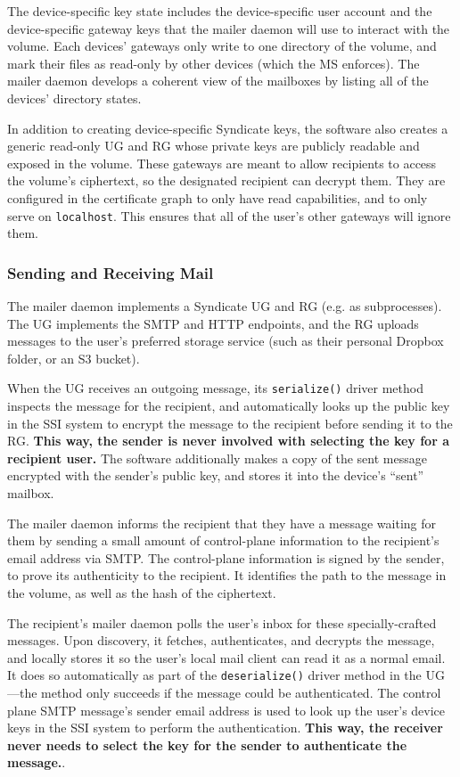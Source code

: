 The device-specific key state includes the device-specific user account and the
device-specific gateway keys that the mailer daemon will use to interact with
the volume.  Each devices' gateways only write to one directory of the volume,
and mark their files as read-only by other devices (which the MS enforces).
The mailer daemon develops a coherent view of the mailboxes by listing all of
the devices' directory states.

In addition to creating device-specific Syndicate keys, the software also
creates a generic read-only UG and RG whose private keys are publicly readable
and exposed in the volume.  These gateways are meant to allow recipients to access
the volume's ciphertext, so the designated recipient can decrypt them.
They are configured in the certificate graph to only have read capabilities, and
to only serve on \texttt{localhost}.  This ensures that all of the user's other
gateways will ignore them.

\subsubsection{Sending and Receiving Mail}

The mailer daemon implements a Syndicate UG and RG (e.g. as subprocesses).
The UG implements the SMTP
and HTTP endpoints, and the RG uploads messages to the user's preferred storage
service (such as their personal Dropbox folder, or an S3 bucket).

When the UG receives an outgoing message, its \texttt{serialize()} driver method inspects the
message for the recipient, and automatically looks up the public key in the SSI
system to encrypt the message to the recipient before sending it to the RG.
\textbf{This way, the sender is never involved with selecting the key for a
recipient user.}  The software additionally makes a copy of the sent message encrypted with the
sender's public key, and stores it into the device's ``sent'' mailbox.

The mailer daemon informs the recipient that they have a message waiting for
them by sending a small amount of control-plane information to the recipient's
email address via SMTP.  The control-plane information is signed by the sender,
to prove its authenticity to the recipient.  It identifies the path to the
message in the volume, as well as the hash of the ciphertext.

The recipient's mailer daemon polls the user's inbox for these specially-crafted
messages.  Upon discovery, it fetches, authenticates, and decrypts the message,
and locally stores it so the user's local mail client can read it as a normal
email.  It does so automatically as part of the \texttt{deserialize()} driver
method in the UG---the method only succeeds if the message could be
authenticated.  The control plane SMTP message's sender email address
is used to look up the user's device keys in the SSI system to perform the authentication.
\textbf{This way, the receiver never needs to select the key for the
sender to authenticate the message.}.

